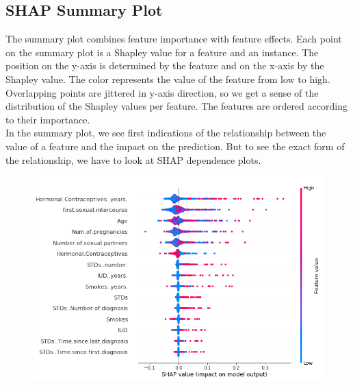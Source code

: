 \subsection{SHAP Summary Plot}
\begin{minipage}{0.40\textwidth}
    The summary plot combines feature importance with feature effects. Each point on the summary plot is a Shapley value for a feature and an instance. The position on the y-axis is determined by the feature and on the x-axis by the Shapley value. The color represents the value of the feature from low to high. Overlapping points are jittered in y-axis direction, so we get a sense of the distribution of the Shapley values per feature. The features are ordered according to their importance.\\

    In the summary plot, we see first indications of the relationship between the value of a feature and the impact on the prediction. But to see the exact form of the relationship, we have to look at SHAP dependence plots.
\end{minipage}
\hfill
\begin{minipage}{0.55\textwidth}
    \begin{figure}[H]
        \includegraphics[width=\textwidth]{img/shap-importance-extended.png}
        \centering
    \end{figure}
\end{minipage}

